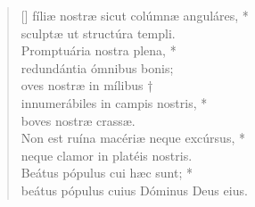 \begin{verse}[\versewidth]
fíliæ nostræ sicut colúmnæ anguláres, *\\
sculptæ ut structúra templi.\\
Promptuária nostra plena, *\\
redundántia ómnibus bonis;\\
oves nostræ in mílibus †\\
innumerábiles in campis nostris, *\\
boves nostræ crassæ.\\
Non est ruína macériæ neque excúrsus, *\\
neque clamor in platéis nostris.\\
Beátus pópulus cui hæc sunt; *\\
beátus pópulus cuius Dóminus Deus eius.\\
\end{verse}
\vspace{1cm}


